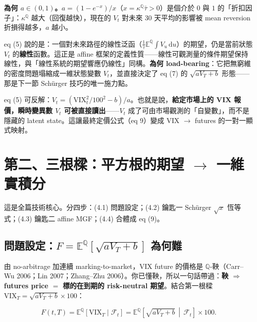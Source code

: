 \documentclass[12pt, a4paper]{article}
\theoremstyle{remark}
\newcommand{\E}{\mathbb{E}}
\newcommand{\Q}{\mathbb{Q}}
\newcommand{\dd}{\mathrm{d}}
\newcommand{\VIX}{\mathrm{VIX}}
\begin{document}
\textbf{為何 $a\in(0,1)$。}$a=(1-e^{-x})/x$（$x=\kappa^\Q\bar\tau>0$）是個介於 $0$ 與 $1$ 的「折扣因子」：$\kappa^\Q$ 越大（回復越快），現在的 $V_t$ 對未來 30 天平均的影響被 mean reversion 折損得越多，$a$ 越小。

\begin{physicsbox}[title={「$\VIX^2$ 是 $V$ 的線性觀測量」$\equiv$ 仿射框架下的線性響應}]
eq (5) 說的是：一個對未來路徑的線性泛函（$\frac1{\bar\tau}\E^\Q\!\int V_u\,\dd u$）的期望，仍是當前狀態 $V_t$ 的\textbf{線性}函數。這正是 affine 框架的定義性質——線性可觀測量的條件期望保持線性，與「線性系統的期望響應仍線性」同構。\textbf{為何 load-bearing}：它把無窮維的密度問題塌縮成一維狀態變數 $V_t$，並直接決定了 eq (7) 的 $\sqrt{aV_T+b}$ 形態——那是下一節 Schürger 技巧的唯一施力點。
\end{physicsbox}

\begin{remarkbox}[title={實務 hook（footnote 2）}]
eq (5) 可反解：$V_t = (\VIX_t^2/100^2 - b)/a$。也就是說，\textbf{給定市場上的 VIX 報價，瞬時變異數 $V_t$ 可被直接讀出}——$V_t$ 成了可由市場觀測的「自變數」，而不是隱藏的 latent state。這讓最終定價公式（eq 9）變成 VIX $\to$ futures 的一對一顯式映射。
\end{remarkbox}

\newpage

\section{第二、三根樑：平方根的期望 $\to$ 一維實積分}

這是全篇技術核心。分四步：(4.1) 問題設定；(4.2) 鑰匙一 Schürger $\sqrt{x}$ 恆等式；(4.3) 鑰匙二 affine MGF；(4.4) 合體成 eq (9)。

\subsection{問題設定：$F=\E^\Q[\sqrt{aV_T+b}]$ 為何難}

由 no-arbitrage 加連續 marking-to-market，VIX future 的價格是 $\Q$-鞅（Carr--Wu 2006；Lin 2007；Zhang--Zhu 2006）。你已懂鞅，所以一句話帶過：\textbf{鞅 $\Rightarrow$ futures price $=$ 標的在到期的 risk-neutral 期望}。結合第一根樑 $\VIX_T=\sqrt{aV_T+b}\times100$：

\begin{equation}
  F(t,T) = \E^\Q\!\left[\VIX_T\mid\mathcal F_t\right]
  = \E^\Q\!\left[\sqrt{aV_T+b}\,\middle|\,\mathcal F_t\right]\times 100.
  \tag{7}
\end{equation}
\end{document}
